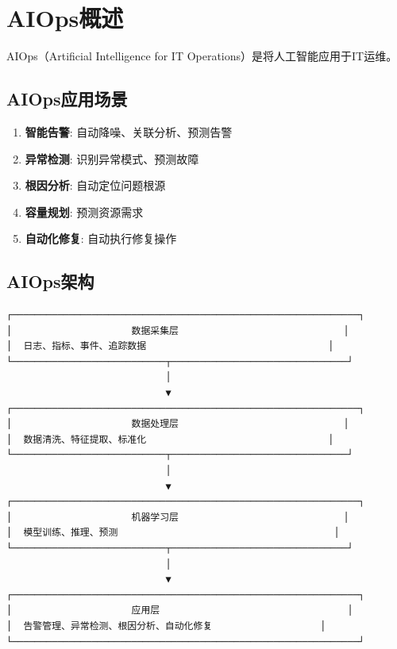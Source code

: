 \documentclass[12pt,UTF8]{ctexbook}
\begin{document}
\section{AIOps概述}
\label{sec:aiops}

AIOps（Artificial Intelligence for IT Operations）是将人工智能应用于IT运维。

\subsection{AIOps应用场景}

\begin{enumerate}
    \item \textbf{智能告警}: 自动降噪、关联分析、预测告警
    \item \textbf{异常检测}: 识别异常模式、预测故障
    \item \textbf{根因分析}: 自动定位问题根源
    \item \textbf{容量规划}: 预测资源需求
    \item \textbf{自动化修复}: 自动执行修复操作
\end{enumerate}

\subsection{AIOps架构}

\begin{lstlisting}
┌─────────────────────────────────────────────────────────────┐
│                     数据采集层                             │
│  日志、指标、事件、追踪数据                                │
└───────────────────────────┬───────────────────────────────┘
                            │
                            ▼
┌─────────────────────────────────────────────────────────────┐
│                     数据处理层                             │
│  数据清洗、特征提取、标准化                                │
└───────────────────────────┬───────────────────────────────┘
                            │
                            ▼
┌─────────────────────────────────────────────────────────────┐
│                     机器学习层                             │
│  模型训练、推理、预测                                      │
└───────────────────────────┬───────────────────────────────┘
                            │
                            ▼
┌─────────────────────────────────────────────────────────────┐
│                     应用层                                 │
│  告警管理、异常检测、根因分析、自动化修复                   │
└─────────────────────────────────────────────────────────────┘
\end{lstlisting}
\end{document}
